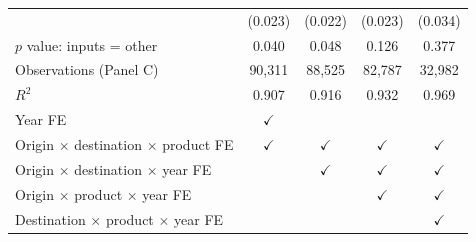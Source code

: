 \begin{tabular}{l*{4}{c}}
 & (0.023) & (0.022) & (0.023) & (0.034) \\
$p$ value: inputs = other & 0.040 & 0.048 & 0.126 & 0.377 \\
Observations (Panel C) & 90,311 & 88,525 & 82,787 & 32,982 \\
$R^2$ & 0.907 & 0.916 & 0.932 & 0.969 \\
\midrule
Year FE & $\checkmark$ &  &  &  \\
Origin $\times$ destination $\times$ product FE & $\checkmark$ & $\checkmark$ & $\checkmark$ & $\checkmark$ \\
Origin $\times$ destination $\times$ year FE &  & $\checkmark$ & $\checkmark$ & $\checkmark$ \\
Origin $\times$ product $\times$ year FE &  &  & $\checkmark$ & $\checkmark$ \\
Destination $\times$ product $\times$ year FE &  &  &  & $\checkmark$ \\
\bottomrule
\end{tabular}
